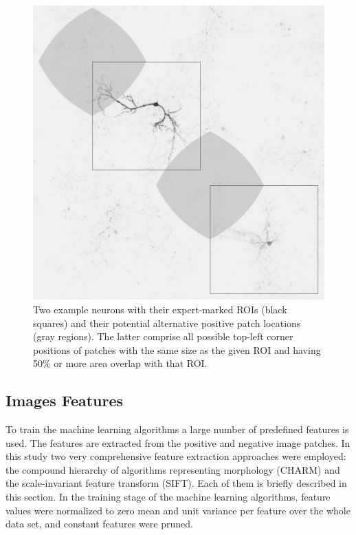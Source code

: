 \begin{figure}
	\begin{minipage}{0.2\textwidth}
		\includegraphics[width=\textwidth]{fig02}
	\end{minipage}
	\hspace{0.02\textwidth}
	\begin{minipage}{0.75\textwidth}
		\caption{Two example neurons with their expert-marked ROIs (black squares) and their potential alternative positive patch locations (gray regions). The latter comprise all possible top-left corner positions of patches with the same size as the given ROI and having 50\% or more area overlap with that ROI.}
		\label{fig:neuronROI}
	\end{minipage}
\end{figure}
\subsection{Images Features}
\label{subsec:imageFeaturesExtraction}
To train the machine learning algorithms a large number of predefined features is used. The features are extracted from the positive and negative image patches. In this study two very comprehensive feature extraction approaches were employed: the compound hierarchy of algorithms representing morphology (CHARM) and the scale-invariant feature transform (SIFT). Each of them is briefly described in this section. In the training stage of the machine learning algorithms, feature values were normalized to zero mean and unit variance per feature over the whole data set, and constant features were pruned.

